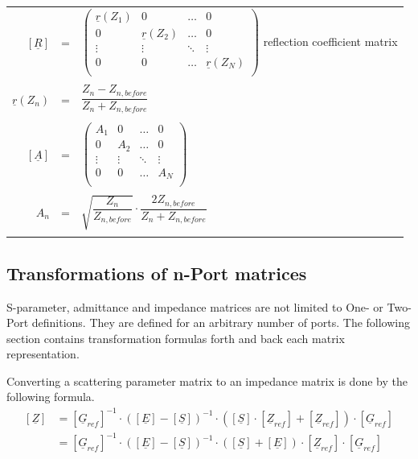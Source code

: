 \begin{tabular}{rll}
$\left[\underline{R}\right]$ & = &
$\begin{pmatrix}
\underline{r}\left(Z_{1}\right) & 0 & \ldots & 0\\
0 & \underline{r}\left(Z_{2}\right) & \ldots & 0\\
\vdots & \vdots & \ddots & \vdots\\
0 & 0 & \ldots & \underline{r}\left(Z_{N}\right)\\
\end{pmatrix}$
reflection coefficient matrix\\& &\\
$\underline{r}\left(Z_{n}\right)$ & = &
$\dfrac{Z_{n} - Z_{n,before}}{Z_{n} + Z_{n,before}}$\\& &\\
$\left[\underline{A}\right]$ & = &
$\begin{pmatrix}
A_1 & 0 & \ldots & 0\\
0 & A_2 & \ldots & 0\\
\vdots & \vdots & \ddots & \vdots\\
0 & 0 & \ldots & A_N\\
\end{pmatrix}$\\& &\\
$A_n$ & = &
$\sqrt{\dfrac{Z_n}{Z_{n,before}}}\cdot\dfrac{2 Z_{n,before}}{Z_{n} + Z_{n,before}}$\\& &\\
\end{tabular}

\subsection{Transformations of n-Port matrices}

S-parameter, admittance and impedance matrices are not limited to One-
or Two-Port definitions.  They are defined for an arbitrary number of
ports.  The following section contains transformation formulas forth
and back each matrix representation.

\addvspace{12pt}

Converting a scattering parameter matrix to an impedance matrix is
done by the following formula.
\begin{align}
\left[
\underline{Z}
\right]
&=
\left[
\underline{G}_{ref}
\right]^{-1}
\cdot
\left(
\left[\underline{E}\right] - \left[\underline{S}\right]
\right)^{-1}
\cdot
\left(
\left[\underline{S}\right] \cdot \left[\underline{Z}_{ref}\right] + \left[\underline{Z}_{ref}\right]
\right)
\cdot
\left[\underline{G}_{ref}\right]\\
&=
\left[
\underline{G}_{ref}
\right]^{-1}
\cdot
\left(
\left[\underline{E}\right] - \left[\underline{S}\right]
\right)^{-1}
\cdot
\left(
\left[\underline{S}\right] + \left[\underline{E}\right]
\right)
\cdot \left[\underline{Z}_{ref}\right]
\cdot \left[\underline{G}_{ref}\right]
\end{align}

